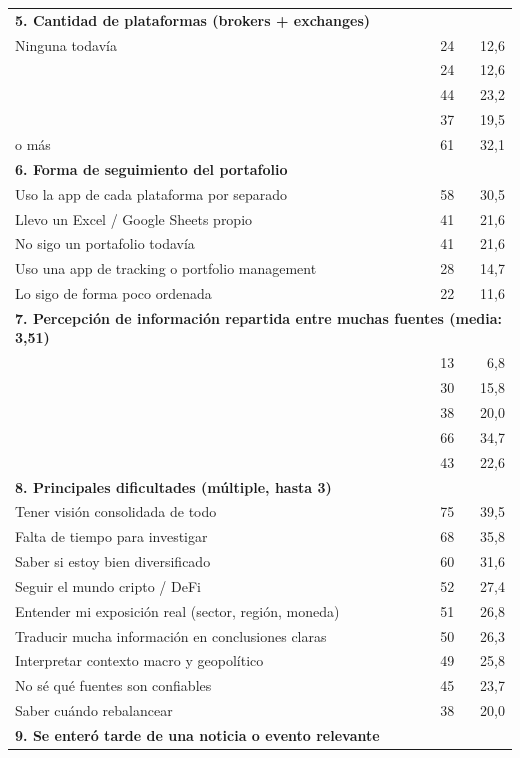 {\begin{longtable}{p{9.3cm} r r}
	\multicolumn{3}{l}{\textbf{5. Cantidad de plataformas (brokers + exchanges)}} \\
	\quad Ninguna todavía & 24 & 12,6 \\
	\quad 1 & 24 & 12,6 \\
	\quad 2 & 44 & 23,2 \\
	\quad 3 & 37 & 19,5 \\
	\quad 4 o más & 61 & 32,1 \\
	\multicolumn{3}{l}{\textbf{6. Forma de seguimiento del portafolio}} \\
	\quad Uso la app de cada plataforma por separado & 58 & 30,5 \\
	\quad Llevo un Excel / Google Sheets propio & 41 & 21,6 \\
	\quad No sigo un portafolio todavía & 41 & 21,6 \\
	\quad Uso una app de tracking o portfolio management & 28 & 14,7 \\
	\quad Lo sigo de forma poco ordenada & 22 & 11,6 \\
	\multicolumn{3}{l}{\textbf{7. Percepción de información repartida entre muchas fuentes (media: 3,51)}} \\
	\quad 1 & 13 & 6,8 \\
	\quad 2 & 30 & 15,8 \\
	\quad 3 & 38 & 20,0 \\
	\quad 4 & 66 & 34,7 \\
	\quad 5 & 43 & 22,6 \\
	\multicolumn{3}{l}{\textbf{8. Principales dificultades (múltiple, hasta 3)}} \\
	\quad Tener visión consolidada de todo & 75 & 39,5 \\
	\quad Falta de tiempo para investigar & 68 & 35,8 \\
	\quad Saber si estoy bien diversificado & 60 & 31,6 \\
	\quad Seguir el mundo cripto / DeFi & 52 & 27,4 \\
	\quad Entender mi exposición real (sector, región, moneda) & 51 & 26,8 \\
	\quad Traducir mucha información en conclusiones claras & 50 & 26,3 \\
	\quad Interpretar contexto macro y geopolítico & 49 & 25,8 \\
	\quad No sé qué fuentes son confiables & 45 & 23,7 \\
	\quad Saber cuándo rebalancear & 38 & 20,0 \\
	\multicolumn{3}{l}{\textbf{9. Se enteró tarde de una noticia o evento relevante}} \\

\end{longtable}}

